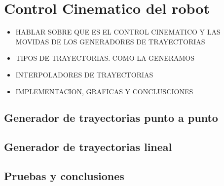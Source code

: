 \section{Control Cinematico del robot}
\begin{itemize}
	\item HABLAR SOBRE QUE ES EL CONTROL CINEMATICO Y LAS MOVIDAS DE LOS GENERADORES DE TRAYECTORIAS
	\item TIPOS DE TRAYECTORIAS. COMO LA GENERAMOS
	\item INTERPOLADORES DE TRAYECTORIAS
	\item IMPLEMENTACION, GRAFICAS Y CONCLUSCIONES 
\end{itemize}
	\subsection{Generador de trayectorias punto a punto}
	\subsection{Generador de trayectorias lineal}
	\subsection{Pruebas y conclusiones}